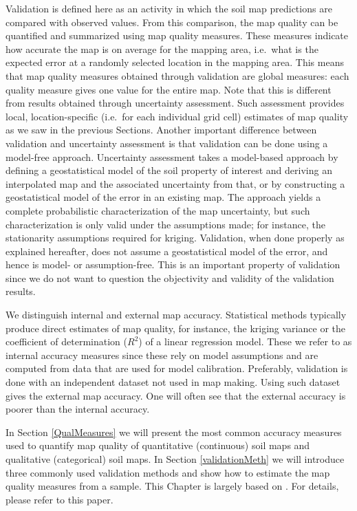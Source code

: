 \documentclass[10pt,b5paper,]{book}
\theoremstyle{definition}
\theoremstyle{definition}
\theoremstyle{definition}
\theoremstyle{remark}
\begin{document}
Validation is defined here as an activity in which the soil map
predictions are compared with observed values. From this comparison, the
map quality can be quantified and summarized using map quality measures.
These measures indicate how accurate the map is on average for the
mapping area, i.e.~what is the expected error at a randomly selected
location in the mapping area. This means that map quality measures
obtained through validation are global measures: each quality measure
gives one value for the entire map. Note that this is different from
results obtained through uncertainty assessment. Such assessment
provides local, location-specific (i.e.~for each individual grid cell)
estimates of map quality as we saw in the previous Sections. Another
important difference between validation and uncertainty assessment is
that validation can be done using a model-free approach. Uncertainty
assessment takes a model-based approach by defining a geostatistical
model of the soil property of interest and deriving an interpolated map
and the associated uncertainty from that, or by constructing a
geostatistical model of the error in an existing map. The approach
yields a complete probabilistic characterization of the map uncertainty,
but such characterization is only valid under the assumptions made; for
instance, the stationarity assumptions required for kriging. Validation,
when done properly as explained hereafter, does not assume a
geostatistical model of the error, and hence is model- or
assumption-free. This is an important property of validation since we do
not want to question the objectivity and validity of the validation
results.

We distinguish internal and external map accuracy. Statistical methods
typically produce direct estimates of map quality, for instance, the
kriging variance or the coefficient of determination (\({R^2}\)) of a
linear regression model. These we refer to as internal accuracy measures
since these rely on model assumptions and are computed from data that
are used for model calibration. Preferably, validation is done with an
independent dataset not used in map making. Using such dataset gives the
external map accuracy. One will often see that the external accuracy is
poorer than the internal accuracy.

In Section \ref{QualMeasures} we will present the most common accuracy
measures used to quantify map quality of quantitative (continuous) soil
maps and qualitative (categorical) soil maps. In Section
\ref{validationMeth} we will introduce three commonly used validation
methods and show how to estimate the map quality measures from a sample.
This Chapter is largely based on \citet{brus2011sampling}. For details,
please refer to this paper.
\end{document}
